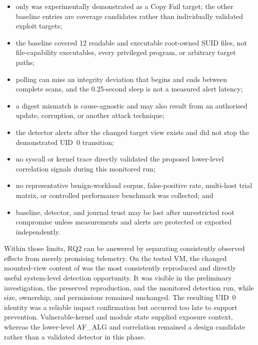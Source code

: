 \begin{itemize}
    \item
    only  was experimentally demonstrated as a Copy Fail
    target; the other baseline entries are coverage candidates rather than
    individually validated exploit targets;

    \item
    the baseline covered 12 readable and executable root-owned SUID files, not
    file-capability executables, every privileged program, or arbitrary target
    paths;

    \item
    polling can miss an integrity deviation that begins and ends between
    complete scans, and the 0.25-second sleep is not a measured alert latency;

    \item
    a digest mismatch is cause-agnostic and may also result from an authorised
    update, corruption, or another attack technique;

    \item
    the detector alerts after the changed target view exists and did not stop
    the demonstrated UID~0 transition;

    \item
    no syscall or kernel trace directly validated the proposed lower-level
    correlation signals during this monitored run;

    \item
    no representative benign-workload corpus, false-positive rate,
    multi-host trial matrix, or controlled performance benchmark was collected;
    and

    \item
    baseline, detector, and journal trust may be lost after unrestricted root
    compromise unless measurements and alerts are protected or exported
    independently.
\end{itemize}

Within those limits, RQ2 can be answered by separating consistently observed
effects from merely promising telemetry. On the tested VM, the changed
mounted-view content of  was the most consistently reproduced
and directly useful system-level detection opportunity. It was visible in the
preliminary investigation, the preserved reproduction, and the monitored
detection run, while size, ownership, and permissions remained unchanged.
The resulting UID~0 identity was a reliable impact confirmation but occurred
too late to support prevention. Vulnerable-kernel and module state supplied
exposure context, whereas the lower-level AF\_ALG and 
correlation remained a design candidate rather than a validated detector in
this phase.

